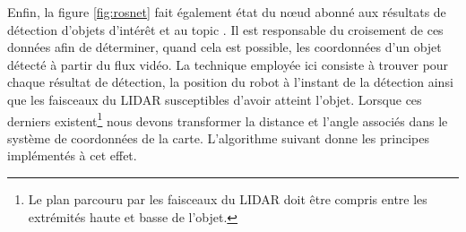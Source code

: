 Enfin, la figure \ref{fig:rosnet} fait également état du n\oe{}ud  abonné aux résultats de détection d'objets d'intérêt et au topic .
Il est responsable du croisement de ces données afin de déterminer, quand cela est possible, les coordonnées d'un objet détecté à partir du flux vidéo.  
La technique employée ici consiste à trouver pour chaque résultat de détection, la position du robot à l'instant de la détection ainsi que les faisceaux du LIDAR susceptibles d'avoir atteint l'objet. 
Lorsque ces 
derniers existent\footnote{Le plan parcouru par les faisceaux du LIDAR doit être compris entre les extrémités haute et basse de l'objet.} nous devons transformer la distance et l'angle associés dans le système de coordonnées de la carte. 
L'algorithme suivant donne les principes implémentés à cet effet. 
\\
\IncMargin{1em}

